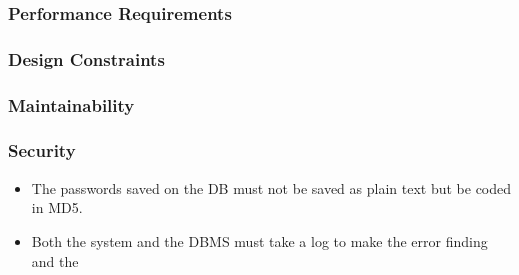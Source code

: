 \subsubsection{Performance Requirements}

\subsubsection{Design Constraints}


\subsubsection{Maintainability}

\subsubsection{Security}
    \begin{itemize}
        \item The passwords saved on the DB must not be saved as plain text but be coded in MD5.
        \item Both the system and the DBMS must take a log to make the error finding and the 
    \end{itemize}